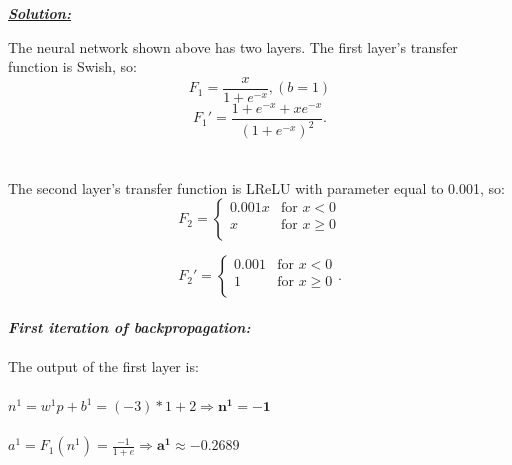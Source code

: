 \documentclass{article}
\begin{document}
\noindent \underline{\textbf{\textit{Solution:}}}

\noindent The neural network shown above has two layers. The first layer's transfer function is Swish, so:
\[ F_1 = \frac{x}{1+e^{-x}}, (b=1) \]  
\[ F_1' = \frac{1+e^{-x} + xe^{-x}}{(1+e^{-x})^2}. \]
\\ \\The second layer's transfer function is LReLU with parameter equal to 0.001, so:
\[ F_2 = \begin{cases}
  0.001x & \text{for } x < 0 \\
  x & \text{for } x \geq 0 \\
\end{cases} \]
 
\[ F_2' = \begin{cases}
  0.001 & \text{for } x < 0 \\
  1 & \text{for } x \geq 0 \\
\end{cases}. \]\\

\noindent \textbf{\textit{First iteration of backpropagation:}}
\noindent \\ \\The output of the first layer is: \\ \\$n^1 = w^1p + b^1 = (-3)*1 + 2 \Rightarrow \bm{n^1 = -1}$
\\ \\$a^1 = F_1(n^1) = \frac{-1}{1+e} \Rightarrow \bm{a^1 \approx -0.2689}$
\end{document}
